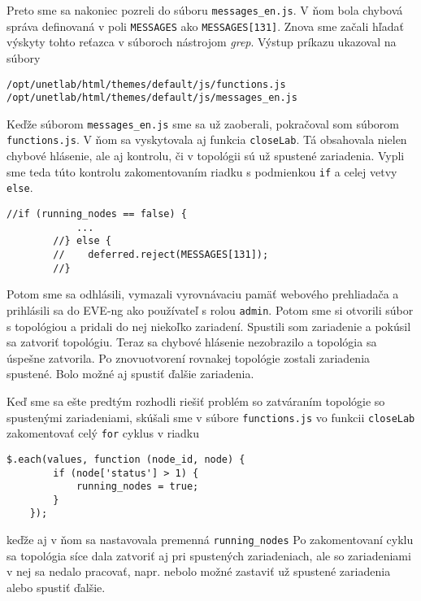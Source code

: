 Preto sme sa nakoniec pozreli do súboru \texttt{messages\_en.js}. V ňom bola chybová správa definovaná v poli \texttt{MESSAGES} ako \texttt{MESSAGES[131]}. Znova sme začali hľadať výskyty tohto reťazca v súboroch nástrojom \emph{grep}. Výstup príkazu ukazoval na súbory

\begin{Verbatim}[samepage=true]
/opt/unetlab/html/themes/default/js/functions.js
/opt/unetlab/html/themes/default/js/messages_en.js
\end{Verbatim}

Keďže súborom \texttt{messages\_en.js} sme sa už zaoberali, pokračoval som súborom \texttt{functions.js}. V ňom sa vyskytovala aj funkcia \texttt{closeLab}. Tá obsahovala nielen chybové hlásenie, ale aj kontrolu, či v topológii sú už spustené zariadenia. Vypli sme teda túto kontrolu zakomentovaním riadku s podmienkou \texttt{if} a celej vetvy \texttt{else}.

\begin{Verbatim}[samepage=true]
        //if (running_nodes == false) {
            ...
        //} else {
        //    deferred.reject(MESSAGES[131]);
        //}
\end{Verbatim}

Potom sme sa odhlásili, vymazali vyrovnávaciu pamäť webového prehliadača a prihlásili sa do EVE-ng ako používateľ s rolou \texttt{admin}. Potom sme si otvorili súbor s topológiou a pridali do nej niekoľko zariadení. Spustili som zariadenie a pokúsil sa zatvoriť topológiu. Teraz sa chybové hlásenie nezobrazilo a topológia sa úspešne zatvorila. Po znovuotvorení rovnakej topológie zostali zariadenia spustené. Bolo možné aj spustiť ďalšie zariadenia.

Keď sme sa ešte predtým rozhodli riešiť problém so zatváraním topológie so spustenými zariadeniami, skúšali sme v súbore \texttt{functions.js} vo funkcii \texttt{closeLab} zakomentovať celý \texttt{for} cyklus v riadku

\begin{Verbatim}[samepage=true]
    $.each(values, function (node_id, node) {
        if (node['status'] > 1) {
            running_nodes = true;
        }
    });
\end{Verbatim}
keďže aj v ňom sa nastavovala premenná \texttt{running\_nodes} Po zakomentovaní cyklu sa topológia síce dala zatvoriť aj pri spustených zariadeniach, ale so zariadeniami v nej sa nedalo pracovať, napr. nebolo možné zastaviť už spustené zariadenia alebo spustiť ďalšie.

